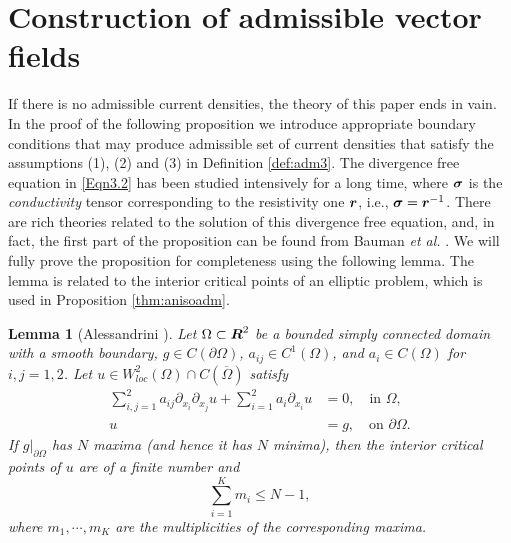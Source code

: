\documentclass[11pt]{amsart}
\theoremstyle{plain}
\newtheorem{Lem}[Thm]{Lemma}
\theoremstyle{remark}
\numberwithin{equation}{section}
\numberwithin{Thm}{section}
\def\R{\mbox{\boldmath$R$}}
\def\r{{\bf r}}
\def\Sigma{\mbox{\boldmath$\sigma$}}
\def\r{\mbox{\boldmath$r$}}
\begin{document}
\appendix

\section{Construction of admissible vector fields}\label{sect.cons}

If there is no admissible current densities, the theory of this paper ends in vain. In the proof of the following proposition we introduce appropriate boundary conditions that may produce admissible set of current densities that satisfy the assumptions (1), (2) and (3) in Definition \ref{def:adm3}. The divergence free equation in \eqref{Eqn3.2} has been studied intensively for a long time, where $\Sigma$ is the \emph{conductivity} tensor corresponding to the resistivity one $\r$, i.e., $\Sigma=\r^{-1}$. There are rich theories related to the solution of this divergence free equation, and, in fact, the first part of the proposition can be found from Bauman \emph{et al.} \cite{MR1871388}. We will fully prove the proposition for completeness using the following lemma. The lemma is related to the interior critical points of an elliptic problem, which is used in Proposition \ref{thm:anisoadm}.

\begin{Lem}[Alessandrini \cite{alessandrini_critical_1987}] \label{lem:aless}
Let $\Omega \subset \R^2$ be a bounded simply connected domain with a smooth boundary, $g \in C(\partial\Omega)$, $a_{ij} \in C^1(\Omega)$, and $a_i \in C(\Omega)$ for $i,j=1,2$. Let $u \in W^2_{loc}(\Omega) \cap C(\overline\Omega)$ satisfy
\begin{align*}
  \sum_{i,j=1}^2 a_{ij} \partial_{x_i}\partial_{x_j}u + \sum_{i=1}^2 a_i \partial_{x_i}u &= 0, \quad \text{in $\Omega$,} \\
  u&=g, \quad \text{on $\partial \Omega$}.
\end{align*}
If $g|_{\partial\Omega}$ has $N$ maxima (and hence it has $N$ minima), then the interior critical points of $u$ are of a finite number and
$$
\sum_{i=1}^K m_i \le N-1,
$$
where $m_1,\cdots,m_K$ are the multiplicities of the corresponding maxima.
\end{Lem}
\end{document}
